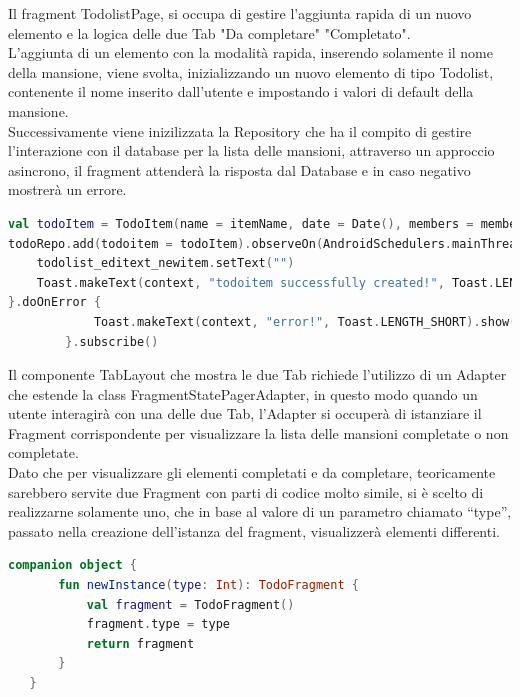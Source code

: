 Il fragment TodolistPage, si occupa di gestire l'aggiunta rapida di un nuovo elemento e la logica delle due Tab "Da completare" "Completato".\\
L'aggiunta di un elemento con la modalità rapida, inserendo solamente il nome della mansione, viene svolta, inizializzando un nuovo elemento di tipo Todolist, contenente il nome inserito dall'utente e impostando i valori di default della mansione.\\ Successivamente viene inizilizzata la Repository che ha il compito di gestire l'interazione con il database per la lista delle mansioni, attraverso un approccio asincrono, il fragment attenderà la risposta dal Database e in caso negativo mostrerà un errore.

\begin{lstlisting}[language=kotlin,caption={Aggiunta elemento Todolist}]
val todoItem = TodoItem(name = itemName, date = Date(), members = members, created_by = userUID)
todoRepo.add(todoitem = todoItem).observeOn(AndroidSchedulers.mainThread()) .subscribeOn(Schedulers.io()).doOnComplete {
    todolist_editext_newitem.setText("")
    Toast.makeText(context, "todoitem successfully created!", Toast.LENGTH_SHORT).show()
}.doOnError {
            Toast.makeText(context, "error!", Toast.LENGTH_SHORT).show()
        }.subscribe()
\end{lstlisting}

Il componente TabLayout che mostra le due Tab richiede l'utilizzo di un Adapter che estende la class FragmentStatePagerAdapter, in questo modo quando un utente interagirà con una delle due Tab, l'Adapter si occuperà di istanziare il Fragment corrispondente per visualizzare la lista delle mansioni completate o non completate.\\
Dato che per visualizzare gli elementi completati e da completare, teoricamente sarebbero servite due Fragment con parti di codice molto simile, si è scelto di realizzarne solamente uno, che in base al valore di un parametro chiamato ``type'', passato nella creazione dell'istanza del fragment, visualizzerà elementi differenti.\\

\begin{lstlisting}[language=kotlin,caption={FragmentTodo.kt}]
companion object {
       fun newInstance(type: Int): TodoFragment {
           val fragment = TodoFragment()
           fragment.type = type
           return fragment
       }
   }
\end{lstlisting}
